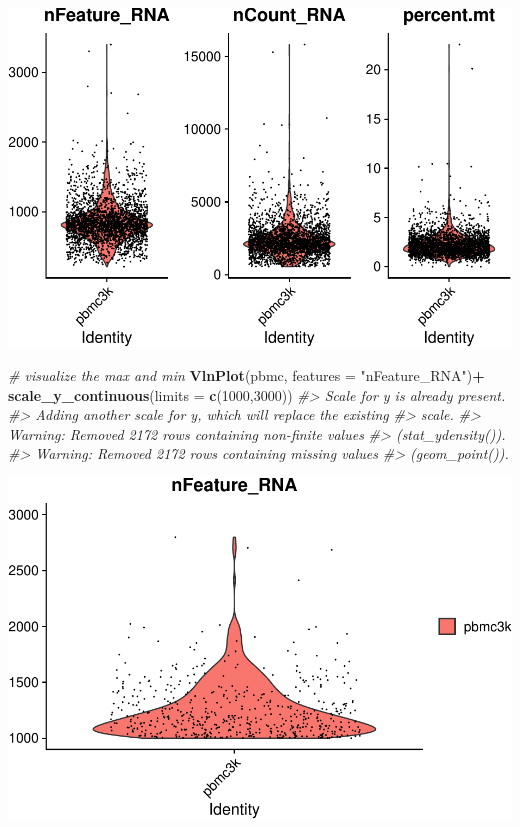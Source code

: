 \documentclass[
]{book}
\newenvironment{Shaded}{\begin{snugshade}}{\end{snugshade}}
\newcommand{\AttributeTok}[1]{\textcolor[rgb]{0.13,0.29,0.53}{#1}}
\newcommand{\CommentTok}[1]{\textcolor[rgb]{0.56,0.35,0.01}{\textit{#1}}}
\newcommand{\DecValTok}[1]{\textcolor[rgb]{0.00,0.00,0.81}{#1}}
\newcommand{\FunctionTok}[1]{\textcolor[rgb]{0.13,0.29,0.53}{\textbf{#1}}}
\newcommand{\NormalTok}[1]{#1}
\newcommand{\SpecialCharTok}[1]{\textcolor[rgb]{0.81,0.36,0.00}{\textbf{#1}}}
\newcommand{\StringTok}[1]{\textcolor[rgb]{0.31,0.60,0.02}{#1}}
\begin{document}
\includegraphics{scRNAseqInR_Doco_files/figure-latex/qc2-1.pdf}

\begin{Shaded}
\begin{Highlighting}[]


\CommentTok{\# visualize the max and min }
\FunctionTok{VlnPlot}\NormalTok{(pbmc, }\AttributeTok{features =} \StringTok{"nFeature\_RNA"}\NormalTok{)}\SpecialCharTok{+} \FunctionTok{scale\_y\_continuous}\NormalTok{(}\AttributeTok{limits =} \FunctionTok{c}\NormalTok{(}\DecValTok{1000}\NormalTok{,}\DecValTok{3000}\NormalTok{))}
\CommentTok{\#\textgreater{} Scale for y is already present.}
\CommentTok{\#\textgreater{} Adding another scale for y, which will replace the existing}
\CommentTok{\#\textgreater{} scale.}
\CommentTok{\#\textgreater{} Warning: Removed 2172 rows containing non{-}finite values}
\CommentTok{\#\textgreater{} (\textasciigrave{}stat\_ydensity()\textasciigrave{}).}
\CommentTok{\#\textgreater{} Warning: Removed 2172 rows containing missing values}
\CommentTok{\#\textgreater{} (\textasciigrave{}geom\_point()\textasciigrave{}).}
\end{Highlighting}
\end{Shaded}

\includegraphics{scRNAseqInR_Doco_files/figure-latex/qc2-2.pdf}
\end{document}
